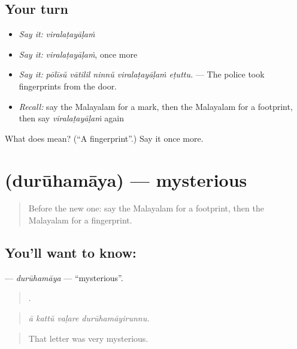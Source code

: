 \subsection*{Your turn}
\begin{itemize}
\raggedright
  \item \emph{Say it:} \emph{viralaṭayāḷaṁ}
  \item \emph{Say it:} \emph{viralaṭayāḷaṁ}, once more
  \item \emph{Say it:} \emph{pōlīsŭ vātilil ninnŭ viralaṭayāḷaṁ eṭuttu.} — The police took fingerprints from the door.
  \item \emph{Recall:} say the Malayalam for a mark, then the Malayalam for a footprint, then say \emph{viralaṭayāḷaṁ} again
\end{itemize}

\begin{tcolorbox}[breakable,colback=teal!4,colframe=teal!35!black,title={Before you move on}]
What does  mean? (\textquotedblleft{}A fingerprint\textquotedblright{}.) Say it once more.
\end{tcolorbox}
\section[\texorpdfstring{\ml{ദുരൂഹമായ} (durūhamāya)}{ദുരൂഹമായ (durūhamāya)}]{ (durūhamāya) — mysterious}

\label{lesson:ML-C366-duruhamaya}



\begin{quote}
Before the new one: say the Malayalam for a footprint, then the Malayalam for a fingerprint.
\end{quote}

\subsection*{You'll want to know: }
\textbf{} — \emph{durūhamāya} — \textquotedblleft{}mysterious\textquotedblright{}.

\begin{quote}
   .
\end{quote}

\begin{quote}
\emph{ā kattŭ vaḷare durūhamāyirunnu.}
\end{quote}

\begin{quote}
That letter was very mysterious.
\end{quote}

